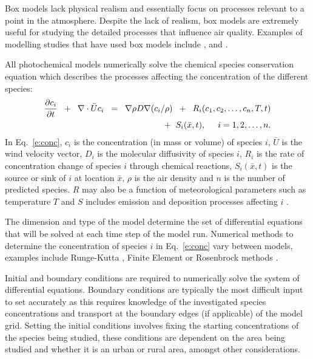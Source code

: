 Box models lack physical realism and essentially focus on processes relevant to a point in the atmosphere.
Despite the lack of realism, box models are extremely useful for studying the detailed processes that influence air quality.
Examples of modelling studies that have used box models include \citet{Bin:2007}, \citet{Li:2014b} and \citet{Noelscher:2014}.

All photochemical models numerically solve the chemical species conservation equation which describes the processes affecting the concentration of the different species:
\begin{equation} \label{e:conc}
    \begin{split}
        \frac{\partial c_i}{\partial t} \hspace{2mm} + \hspace{2mm} \nabla \cdot \bar{U}c_i \hspace{2mm} = \hspace{2mm} \nabla \rho D \nabla(c_i/\rho) \hspace{2mm} + \hspace{2mm} R_i(c_1, c_2, \dots, c_n, T, t) \\ + \hspace{2mm} S_i(\bar{x}, t), \hspace{5mm} i = 1, 2, \dots, n.
    \end{split}
\end{equation}
In Eq.~\eqref{e:conc}, $c_i$ is the concentration (in mass or volume) of species $i$, $\bar{U}$ is the wind velocity vector, $D_i$ is the molecular diffusivity of species $i$, $R_i$ is the rate of concentration change of species $i$ through chemical reactions, $S_i(\bar{x}, t)$ is the source or sink of $i$ at location $\bar{x}$, $\rho$ is the air density and $n$ is the number of predicted species.
$R$ may also be a function of meteorological parameters such as temperature $T$ and $S$ includes emission and deposition processes affecting $i$ \citep{Russell:2000}.

The dimension and type of the model determine the set of differential equations that will be solved at each time step of the model run. 
Numerical methods to determine the concentration of species $i$ in Eq.~\eqref{e:conc} vary between models, examples include Runge-Kutta \citep{Sandu:1997b}, Finite Element \citep{Russell:2000} or Rosenbrock methods \citep{Sandu:1997a}.

Initial and boundary conditions are required to numerically solve the system of differential equations.
Boundary conditions are typically the most difficult input to set accurately as this requires knowledge of the investigated species concentrations and transport at the boundary edges (if applicable) of the model grid.  
Setting the initial conditions involves fixing the starting concentrations of the species being studied, these conditions are dependent on the area being studied and whether it is an urban or rural area, amongst other considerations. 

